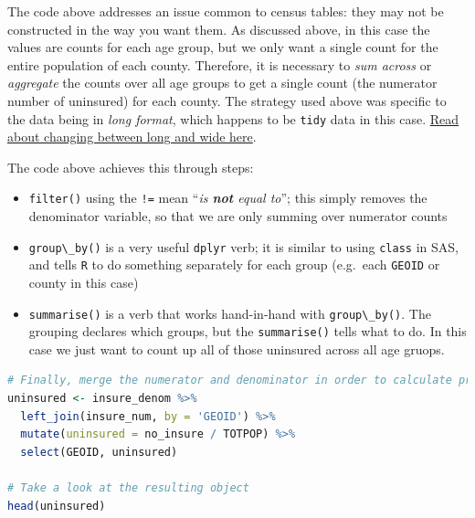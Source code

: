 \documentclass[
]{book}
\newcommand{\passthrough}[1]{#1}
\providecommand{\tightlist}{%
  \setlength{\itemsep}{0pt}\setlength{\parskip}{0pt}}
\begin{document}
The code above addresses an issue common to census tables: they may not be constructed in the way you want them. As discussed above, in this case the values are counts for each age group, but we only want a single count for the entire population of each county. Therefore, it is necessary to \emph{sum across} or \emph{aggregate} the counts over all age groups to get a single count (the numerator number of uninsured) for each county. The strategy used above was specific to the data being in \emph{long format}, which happens to be \passthrough{\lstinline!tidy!} data in this case. \protect\hyperlink{pivot_}{Read about changing between long and wide here}.

The code above achieves this through steps:

\begin{itemize}
\tightlist
\item
  \passthrough{\lstinline!filter()!} using the \passthrough{\lstinline"!="} mean ``\emph{is \textbf{not} equal to}''; this simply removes the denominator variable, so that we are only summing over numerator counts
\item
  \passthrough{\lstinline!group\_by()!} is a very useful \passthrough{\lstinline!dplyr!} verb; it is similar to using \passthrough{\lstinline!class!} in SAS, and tells \passthrough{\lstinline!R!} to do something separately for each group (e.g.~each \passthrough{\lstinline!GEOID!} or county in this case)
\item
  \passthrough{\lstinline!summarise()!} is a verb that works hand-in-hand with \passthrough{\lstinline!group\_by()!}. The grouping declares which groups, but the \passthrough{\lstinline!summarise()!} tells what to do. In this case we just want to count up all of those uninsured across all age gruops.
\end{itemize}

\begin{lstlisting}[language=R]
# Finally, merge the numerator and denominator in order to calculate prevalence
uninsured <- insure_denom %>%
  left_join(insure_num, by = 'GEOID') %>%
  mutate(uninsured = no_insure / TOTPOP) %>%
  select(GEOID, uninsured)

# Take a look at the resulting object
head(uninsured)
\end{lstlisting}

 
  \providecommand{\huxb}[2]{\arrayrulecolor[RGB]{#1}\global\arrayrulewidth=#2pt}
  \providecommand{\huxvb}[2]{\color[RGB]{#1}\vrule width #2pt}
  \providecommand{\huxtpad}[1]{\rule{0pt}{#1}}
  \providecommand{\huxbpad}[1]{\rule[-#1]{0pt}{#1}}
\end{document}
